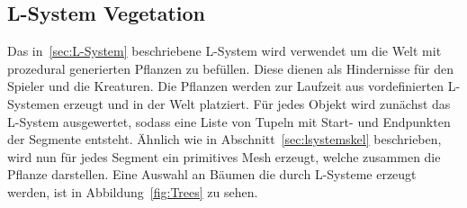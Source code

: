 \subsection{L-System Vegetation}
Das in~\ref{sec:L-System} beschriebene L-System wird verwendet um die Welt mit prozedural generierten Pflanzen zu befüllen.
Diese dienen als Hindernisse für den Spieler und die Kreaturen.
Die Pflanzen werden zur Laufzeit aus vordefinierten L-Systemen erzeugt und in der Welt platziert.
Für jedes Objekt wird zunächst das L-System ausgewertet, sodass eine Liste von Tupeln mit Start- und Endpunkten der Segmente entsteht.
Ähnlich wie in Abschnitt~\ref{sec:lsystemskel} beschrieben, wird nun für jedes Segment ein primitives Mesh erzeugt, welche zusammen die Pflanze darstellen.
Eine Auswahl an Bäumen die durch L-Systeme erzeugt werden, ist in Abbildung~\ref{fig:Trees} zu sehen.
